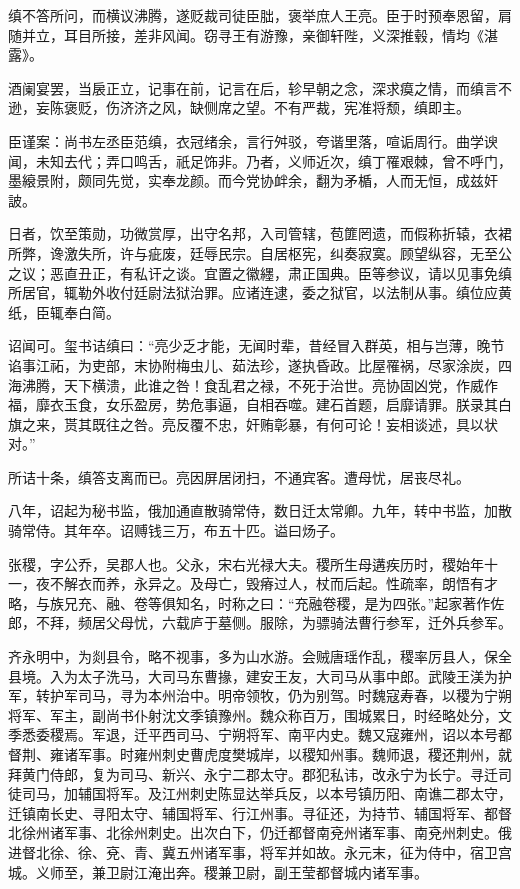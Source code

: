 \documentclass[12pt,UTF8]{ctexbook}
\begin{document}
缜不答所问，而横议沸腾，遂贬裁司徒臣朏，褒举庶人王亮。臣于时预奉恩留，肩随并立，耳目所接，差非风闻。窃寻王有游豫，亲御轩陛，义深推毂，情均《湛露》。

酒阑宴罢，当扆正立，记事在前，记言在后，轸早朝之念，深求瘼之情，而缜言不逊，妄陈褒贬，伤济济之风，缺侧席之望。不有严裁，宪准将颓，缜即主。

臣谨案：尚书左丞臣范缜，衣冠绪余，言行舛驳，夸谐里落，喧诟周行。曲学谀闻，未知去代；弄口鸣舌，祇足饰非。乃者，义师近次，缜丁罹艰棘，曾不呼门，墨縗景附，颇同先觉，实奉龙颜。而今党协衅余，翻为矛楯，人而无恒，成兹奸詖。

日者，饮至策勋，功微赏厚，出守名邦，入司管辖，苞篚罔遗，而假称折辕，衣裙所弊，谗激失所，许与疵废，廷辱民宗。自居枢宪，纠奏寂寞。顾望纵容，无至公之议；恶直丑正，有私讦之谈。宜置之徽纆，肃正国典。臣等参议，请以见事免缜所居官，辄勒外收付廷尉法狱治罪。应诸连逮，委之狱官，以法制从事。缜位应黄纸，臣辄奉白简。

诏闻可。玺书诘缜曰：“亮少乏才能，无闻时辈，昔经冒入群英，相与岂薄，晚节谄事江祏，为吏部，末协附梅虫儿、茹法珍，遂执昏政。比屋罹祸，尽家涂炭，四海沸腾，天下横溃，此谁之咎！食乱君之禄，不死于治世。亮协固凶党，作威作福，靡衣玉食，女乐盈房，势危事逼，自相吞噬。建石首题，启靡请罪。朕录其白旗之来，贳其既往之咎。亮反覆不忠，奸贿彰暴，有何可论！妄相谈述，具以状对。”

所诘十条，缜答支离而已。亮因屏居闭扫，不通宾客。遭母忧，居丧尽礼。

八年，诏起为秘书监，俄加通直散骑常侍，数日迁太常卿。九年，转中书监，加散骑常侍。其年卒。诏赙钱三万，布五十匹。谥曰炀子。

张稷，字公乔，吴郡人也。父永，宋右光禄大夫。稷所生母遘疾历时，稷始年十一，夜不解衣而养，永异之。及母亡，毁瘠过人，杖而后起。性疏率，朗悟有才略，与族兄充、融、卷等俱知名，时称之曰：“充融卷稷，是为四张。”起家著作佐郎，不拜，频居父母忧，六载庐于墓侧。服除，为骠骑法曹行参军，迁外兵参军。

齐永明中，为剡县令，略不视事，多为山水游。会贼唐瑶作乱，稷率厉县人，保全县境。入为太子洗马，大司马东曹掾，建安王友，大司马从事中郎。武陵王渼为护军，转护军司马，寻为本州治中。明帝领牧，仍为别驾。时魏寇寿春，以稷为宁朔将军、军主，副尚书仆射沈文季镇豫州。魏众称百万，围城累日，时经略处分，文季悉委稷焉。军退，迁平西司马、宁朔将军、南平内史。魏又寇雍州，诏以本号都督荆、雍诸军事。时雍州刺史曹虎度樊城岸，以稷知州事。魏师退，稷还荆州，就拜黄门侍郎，复为司马、新兴、永宁二郡太守。郡犯私讳，改永宁为长宁。寻迁司徒司马，加辅国将军。及江州刺史陈显达举兵反，以本号镇历阳、南谯二郡太守，迁镇南长史、寻阳太守、辅国将军、行江州事。寻征还，为持节、辅国将军、都督北徐州诸军事、北徐州刺史。出次白下，仍迁都督南兗州诸军事、南兗州刺史。俄进督北徐、徐、兗、青、冀五州诸军事，将军并如故。永元末，征为侍中，宿卫宫城。义师至，兼卫尉江淹出奔。稷兼卫尉，副王莹都督城内诸军事。
\end{document}
